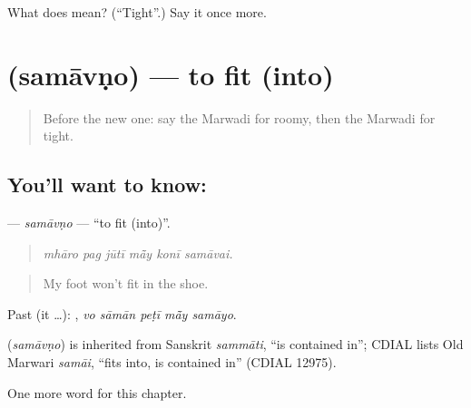 \begin{tcolorbox}[breakable,colback=teal!4,colframe=teal!35!black,title={Before you move on}]
What does  mean? (\textquotedblleft{}Tight\textquotedblright{}.) Say it once more.
\end{tcolorbox}
\section[\texorpdfstring{\mw{समावणो} (samāvṇo)}{समावणो (samāvṇo)}]{ (samāvṇo) — to fit (into)}

\label{lesson:MW-C211-samavno}



\begin{quote}
Before the new one: say the Marwadi for roomy, then the Marwadi for tight.
\end{quote}

\subsection*{You'll want to know: }
\textbf{} — \emph{samāvṇo} — \textquotedblleft{}to fit (into)\textquotedblright{}.

\begin{quote}
     
\end{quote}

\begin{quote}
\emph{mhāro pag jūtī mā̃y konī samāvai.}
\end{quote}

\begin{quote}
My foot won't fit in the shoe.
\end{quote}

Past (it …):     , \emph{vo sāmān peṭī mā̃y samāyo}.

\begin{cousinweb}
\textbf{} (\emph{samāvṇo}) is inherited from Sanskrit \emph{sammāti}, \textquotedblleft{}is contained in\textquotedblright{}; CDIAL lists Old Marwari \emph{samāi}, \textquotedblleft{}fits into, is contained in\textquotedblright{} (CDIAL 12975).
\end{cousinweb}

\begin{grammarlens}[title={What you've built}]
One more word for this chapter.
\end{grammarlens}

